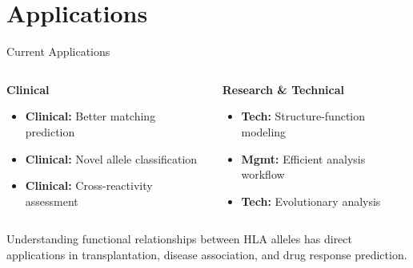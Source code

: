 \documentclass[aspectratio=169]{beamer}
\newcommand{\formanagement}[1]{\textcolor{managementcolor}{\textbf{Mgmt:} #1}}
\newcommand{\forclinical}[1]{\textcolor{clinicalcolor}{\textbf{Clinical:} #1}}
\newcommand{\forbioinformatics}[1]{\textcolor{bioinfocolor}{\textbf{Tech:} #1}}
\begin{document}
\section{Applications}

\begin{frame}{Current Applications}
  \begin{columns}
    \begin{column}{0.5\textwidth}
      \textbf{Clinical}
      \begin{itemize}\small
        \item \forclinical{Better matching prediction}
        \item \forclinical{Novel allele classification}
        \item \forclinical{Cross-reactivity assessment}
      \end{itemize}
    \end{column}
    \begin{column}{0.5\textwidth}
      \textbf{Research \& Technical}
      \begin{itemize}\small
        \item \forbioinformatics{Structure-function modeling}
        \item \formanagement{Efficient analysis workflow}
        \item \forbioinformatics{Evolutionary analysis}
      \end{itemize}
    \end{column}
  \end{columns}
  
  \begin{tcolorbox}[colback=hlablue!5,colframe=hlablue]\small
  Understanding functional relationships between HLA alleles has direct applications in transplantation, disease association, and drug response prediction.
  \end{tcolorbox}
\end{frame}
\end{document}
